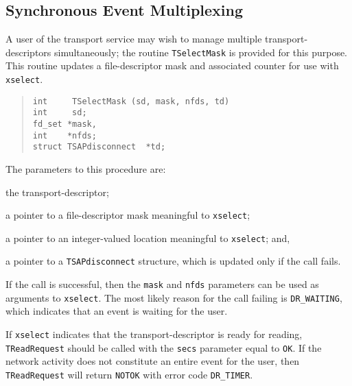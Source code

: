 \subsection	{Synchronous Event Multiplexing}
A user of the transport service may wish to manage multiple
transport-descriptors simultaneously;
the routine \verb"TSelectMask" is provided for this purpose.
This routine updates a file-descriptor mask and associated counter for use
with \verb"xselect".
\begin{quote}\small\begin{verbatim}
int     TSelectMask (sd, mask, nfds, td)
int     sd;
fd_set *mask,
int    *nfds;
struct TSAPdisconnect  *td;
\end{verbatim}\end{quote}
The parameters to this procedure are:
\begin{describe}
\item[\verb"sd":] the transport-descriptor;

\item[\verb"mask":] a pointer to a file-descriptor mask meaningful to
\verb"xselect";

\item[\verb"nfds":] a pointer to an integer-valued location meaningful to
\verb"xselect";
and,

\item[\verb"td":] a pointer to a \verb"TSAPdisconnect" structure, which is
updated only if the call fails.
\end{describe}
If the call is successful, then the \verb"mask" and \verb"nfds" parameters can
be used as arguments to \verb"xselect".
The most likely reason for the call failing is \verb"DR_WAITING",
which indicates that an event is waiting for the user.

If \verb"xselect" indicates that the transport-descriptor is ready for reading,
\verb"TReadRequest" should be called with the \verb"secs" parameter equal to
\verb"OK".
If the network activity does not constitute an entire event for the user,
then \verb"TReadRequest" will return \verb"NOTOK" with error code
\verb"DR_TIMER".


